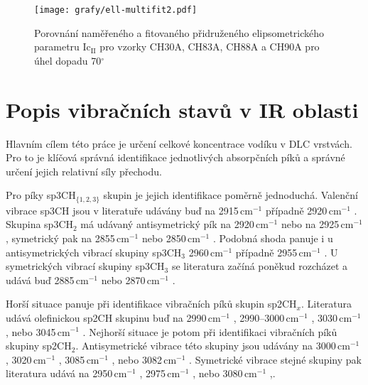 \begin{figure}[ht]
	\texttt{[image: grafy/ell-multifit2.pdf]}
	\caption{Porovnání naměřeného a fitovaného přidruženého elipsometrického parametru Ic$_{\mathrm{II}}$ pro vzorky CH30A, CH83A, CH88A a CH90A pro úhel dopadu 70$^\circ$}
	\label{ell-multifit2}
\end{figure}

\clearpage

\section{Popis vibračních stavů v IR oblasti}
Hlavním cílem této práce je určení celkové koncentrace vodíku v DLC vrstvách. Pro to je klíčová správná identifikace jednotlivých absorpčních píků a správné určení jejich relativní síly přechodu.

Pro píky sp3CH$_{\{1,2,3\}}$ skupin je jejich identifikace poměrně jednoduchá. Valenční vibrace sp3CH jsou v literatuře udávány buď na 2915\,cm$^{-1}$ \cite{Zajickova2011, Dischler1983} případně 2920\,cm$^{-1}$ \cite{Robertson2002, Ristein1998}. Skupina sp3CH$_2$ má udávaný antisymetrický pík na 2920\,cm$^{-1}$ \cite{Dischler1983, Robertson2002, Ristein1998} nebo na 2925\,cm$^{-1}$ \cite{Zajickova2011}, symetrický pak na 2855\,cm$^{-1}$ \cite{Robertson2002, Ristein1998, Zajickova2011} nebo 2850\,cm$^{-1}$ \cite{Dischler1983}. Podobná shoda panuje i u antisymetrických vibrací skupiny sp3CH$_3$ 2960\,cm$^{-1}$ \cite{Zajickova2011, Dischler1983} případně 2955\,cm$^{-1}$ \cite{Robertson2002, Ristein1998}. U symetrických vibrací skupiny sp3CH$_3$ se literatura začíná poněkud rozcházet a udává buď 2885\,cm$^{-1}$ \cite{Robertson2002, Ristein1998} nebo 2870\,cm$^{-1}$ \cite{Zajickova2011, Dischler1983}. 

Horší situace panuje při identifikace vibračních píků skupin sp2CH$_x$. Literatura udává olefinickou sp2CH skupinu buď na 2990\,cm$^{-1}$ \cite{Ristein1998}, 2990--3000\,cm$^{-1}$ \cite{Robertson2002}, 3030\,cm$^{-1}$ \cite{Zajickova2011}, nebo 3045\,cm$^{-1}$ \cite{Dischler1983}. Nejhorší situace je potom při identifikaci vibračních píků skupiny sp2CH$_2$. Antisymetrické vibrace této skupiny jsou udávány na 3000\,cm$^{-1}$ \cite{Zajickova2011}, 3020\,cm$^{-1}$ \cite{Dischler1983}, 3085\,cm$^{-1}$ \cite{Robertson2002}, nebo 3082\,cm$^{-1}$ \cite{Ristein1998}. Symetrické vibrace stejné skupiny pak literatura udává na 2950\,cm$^{-1}$ \cite{Dischler1983}, 2975\,cm$^{-1}$ \cite{Robertson2002, Ristein1998}, nebo 3080\,cm$^{-1}$ \cite{Zajickova2011},.

